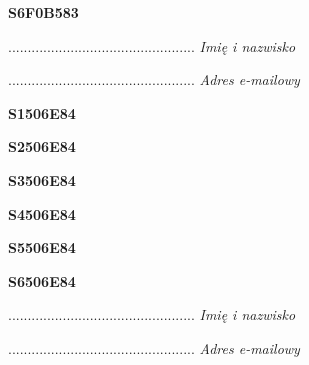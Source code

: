 \begin{turn}{90}\huge \textbf{S6F0B583}\end{turn}

\begin{turn}{90}\begin{minipage}{\linewidth} \vspace{20mm} ................................................  \textit{Imię i nazwisko}\end{minipage}\end{turn}

\begin{turn}{90}\begin{minipage}{\linewidth} \vspace{20mm} ................................................  \textit{Adres e-mailowy}\end{minipage}\end{turn}

\begin{turn}{90}\huge \textbf{S1506E84}\end{turn}

\begin{turn}{90}\huge \textbf{S2506E84}\end{turn}

\begin{turn}{90}\huge \textbf{S3506E84}\end{turn}

\begin{turn}{90}\huge \textbf{S4506E84}\end{turn}

\begin{turn}{90}\huge \textbf{S5506E84}\end{turn}

\begin{turn}{90}\huge \textbf{S6506E84}\end{turn}

\begin{turn}{90}\begin{minipage}{\linewidth} \vspace{20mm} ................................................  \textit{Imię i nazwisko}\end{minipage}\end{turn}

\begin{turn}{90}\begin{minipage}{\linewidth} \vspace{20mm} ................................................  \textit{Adres e-mailowy}\end{minipage}\end{turn}

